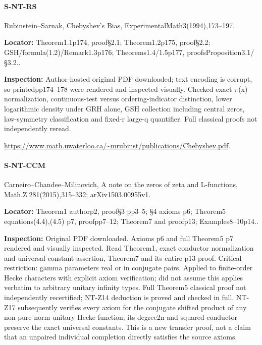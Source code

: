 \documentclass[11pt,a4paper]{article}
\begin{document}
\paragraph{S-NT-RS} Rubinstein–\allowbreak{}Sarnak, Chebyshev’s Bias, ExperimentalMath3(1994),173–\allowbreak{}197.

\textbf{Locator:} Theorem1.\allowbreak{}1p174, proof§2.\allowbreak{}1; Theorem1.\allowbreak{}2p175, proof§2.\allowbreak{}2; GSH/\allowbreak{}formula(1.\allowbreak{}2)/\allowbreak{}Remark1.\allowbreak{}3p176; Theorems1.\allowbreak{}4/\allowbreak{}1.\allowbreak{}5p177, proofsProposition3.\allowbreak{}1/\allowbreak{}§3.\allowbreak{}2.\allowbreak{}.

\textbf{Inspection:} Author-hosted original PDF downloaded; text encoding is corrupt, so printedpp174–\allowbreak{}178 were rendered and inspected visually.\allowbreak{} Checked exact \ensuremath{\pi}(x) normalization, continuous-test versus ordering-indicator distinction, lower logarithmic density under GRH alone, GSH collection including central zeros, law-symmetry classification and fixed-r large-q quantifier.\allowbreak{} Full classical proofs not independently reread.\allowbreak{}

\url{https://www.math.uwaterloo.ca/~mrubinst/publications/Chebyshev.pdf}.

\paragraph{S-NT-CCM} Carneiro–\allowbreak{}Chandee–\allowbreak{}Milinovich, A note on the zeros of zeta and L-functions, Math.\allowbreak{}Z.\allowbreak{}281(2015),315–\allowbreak{}332; arXiv1503.\allowbreak{}00955v1.

\textbf{Locator:} Theorem1 authorp2, proof§3 pp3–\allowbreak{}5; §4 axioms p6; Theorem5 equations(4.\allowbreak{}4),(4.\allowbreak{}5) p7, proofpp7–\allowbreak{}12; Theorem7 and proofp13; Examples8–\allowbreak{}10p14.\allowbreak{}.

\textbf{Inspection:} Original PDF downloaded.\allowbreak{} Axioms p6 and full Theorem5 p7 rendered and visually inspected.\allowbreak{} Read Theorem1, exact conductor normalization and universal-constant assertion, Theorem7 and its entire p13 proof.\allowbreak{} Critical restriction:\allowbreak{} gamma parameters real or in conjugate pairs.\allowbreak{} Applied to finite-order Hecke characters with explicit axiom verification; did not assume this applies verbatim to arbitrary unitary infinity types.\allowbreak{} Full Theorem5 classical proof not independently recertified; NT-Z14 deduction is proved and checked in full.\allowbreak{} NT-Z17 subsequently verifies every axiom for the conjugate shifted product of any non-pure-norm unitary Hecke function; its degree2n and squared conductor preserve the exact universal constants.\allowbreak{} This is a new transfer proof, not a claim that an unpaired individual completion directly satisfies the source axioms.\allowbreak{}
\end{document}
